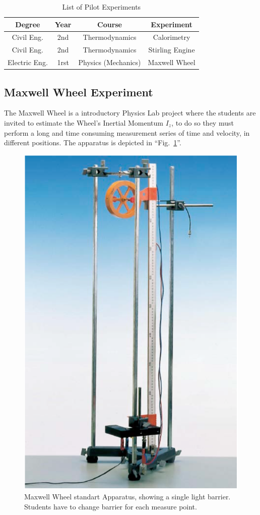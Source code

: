 \documentclass[conference]{IEEEtran}
\begin{document}
\begin{table}[htbp]
\caption{List of Pilot Experiments}
\begin{center}
\begin{tabular}{|c|c|c|c|}
\hline
\textbf{Degree}&\textbf{Year}&\textbf{Course} &\textbf{Experiment}\\
\hline
Civil Eng. & 2nd&  Thermodynamics & Calorimetry\\
\hline
Civil Eng. & 2nd&  Thermodynamics & Stirling Engine\\
\hline
 Electric Eng.& 1rst&  Physics (Mechanics) & Maxwell Wheel\\
\hline
\end{tabular}
\label{tab1}
\end{center}
\end{table}

\subsection{Maxwell Wheel Experiment}
The Maxwell Wheel is a introductory Physics Lab project\cite{b6} where the students are 
invited to estimate the Wheel's Inertial Momentum  $I_z$,
to do so they must perform a long and time consuming measurement series of time and velocity, 
in different positions. 
The apparatus is depicted in ``Fig.~\ref{figMaxwell}''.

\begin{figure}[htbp]
    \centerline{\includegraphics[width=.6\columnwidth]{maxwell.png}}
    \caption{Maxwell Wheel standart Apparatus, showing a single light barrier. Students have to change barrier for each measure point.}
\label{figMaxwell}
\end{figure}
\end{document}
